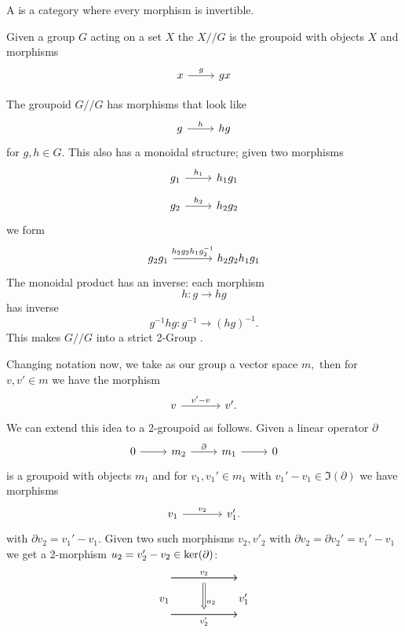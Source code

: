 \documentclass[12pt]{article}
\begin{document}

A  is a category where every morphism is invertible.

Given a group $G$ acting on a set $X$
the  $X//G$
is the groupoid with objects $X$ and morphisms
\[\begin{tikzcd} x \arrow{r}{g} & gx \end{tikzcd} \]

The groupoid $G//G$ has morphisms that look like
\[\begin{tikzcd} g \arrow{r}{h} & hg \end{tikzcd} \]
for $g, h\in G.$
This also has a monoidal structure; given two
morphisms
\[\begin{tikzcd}[row sep=small]
g_1 \arrow{r}{h_1} & h_1g_1 \\
g_2 \arrow{r}{h_2} & h_2g_2
\end{tikzcd} \]
we form
\[\begin{tikzcd}[row sep=large, column sep = large]
g_2 g_1 \arrow{r}{h_2 g_2 h_1 g_2^{-1}} & h_2 g_2 h_1 g_1 
\end{tikzcd} \]
The monoidal product has an inverse: 
each morphism 
$$h:g\to hg$$ 
has inverse 
$$g^{-1}hg : g^{-1}\to (hg)^{-1}.$$
This makes $G//G$ into a strict 2-Group \cite{Roberts2007}.

\def\bdy{\partial}

Changing notation now, we take as our group a vector space $m,$
then for $v,v'\in m$ we have the morphism
\[\begin{tikzcd}[column sep = large]
v \arrow{r}{v'-v} & v'. \end{tikzcd} \]
We can extend this idea to a 2-groupoid as follows.
Given a linear operator $\bdy$
\[\begin{tikzcd} 0 \arrow{r} & m_2 \arrow{r}{\bdy} & m_1 \arrow{r} & 0 \end{tikzcd} \]
is a groupoid with objects $m_1$ and
for $v_1, v_1'\in m_1$ with $v_1'-v_1 \in \Im(\bdy)$
we have morphisms
\[\begin{tikzcd}[column sep = large]
v_1 \arrow{r}{v_2} & v_1'. \end{tikzcd} \]
with $\bdy v_2=v_1'-v_1.$
Given two such morphisms $v_2, v'_2$ with $\bdy v_2=\bdy v_2'=v_1'-v_1$ 
we get a 2-morphism $u_2=v_2'-v_2\in\Ker(\bdy)$:
$$
\begin{tikzcd}[column sep = small, row sep = tiny]
\ \arrow{rr}[]{v_2} \arrow{rr}[name=U,below]{} & \ & \   \\
v_1         & \ \ \ \ {}_{u_2}              & v_1' \\
\ \arrow{rr}[below]{v_2'} \arrow{rr}[name=D]{}  &  \     & \   \\
\arrow[Rightarrow,to path=(U) -- (D),left]{}
\end{tikzcd}
$$
\end{document}
